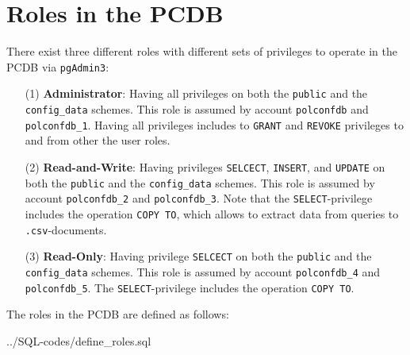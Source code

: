 \section{Roles in the PCDB}\label{sec_access_roles}

There exist three different roles with different sets of privileges to operate in the PCDB via \texttt{\footnotesize pgAdmin3}:
\begin{itemize}
\item[(1)]{{\bf Administrator}: Having all privileges on both the \texttt{\footnotesize public} and the \texttt{\footnotesize config\_data} schemes. 
This role is assumed by account \texttt{\footnotesize polconfdb} and \texttt{\footnotesize polconfdb\_1}. 
Having all privileges includes to \texttt{\footnotesize GRANT} and \texttt{\footnotesize REVOKE} privileges to and from other the user roles.}

\item[(2)]{{\bf Read-and-Write}: Having privileges  \texttt{\footnotesize SELCECT},  \texttt{\footnotesize INSERT}, and  \texttt{\footnotesize UPDATE} on both the \texttt{\footnotesize public} and the \texttt{\footnotesize config\_data} schemes. 
This role is assumed by account \texttt{\footnotesize polconfdb\_2} and \texttt{\footnotesize polconfdb\_3}.
Note that the  \texttt{\footnotesize SELECT}-privilege includes the operation  \texttt{\footnotesize COPY TO}, which allows to extract data from queries to  \texttt{\footnotesize .csv}-documents.}

\item[(3)]{{\bf Read-Only}: Having privilege \texttt{\footnotesize SELCECT} on both the \texttt{\footnotesize public} and the \texttt{\footnotesize config\_data} schemes. 
This role is assumed by account \texttt{\footnotesize polconfdb\_4} and \texttt{\footnotesize polconfdb\_5}.
The \texttt{\footnotesize SELECT}-privilege includes the operation  \texttt{\footnotesize COPY TO}.}
\end{itemize}

The roles in the PCDB are defined as follows:

%
{../SQL-codes/define_roles.sql}